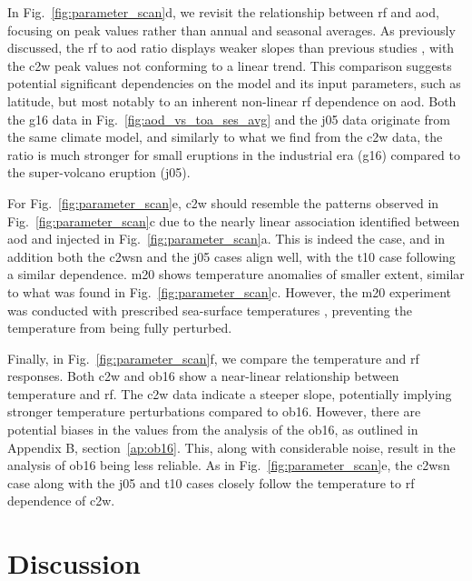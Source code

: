 \documentclass{ametsocV6.1}
\newcommand{\iso}[1][i]{{#1}njected \ce{SO2}}
\begin{document}
In Fig.~\ref{fig:parameter_scan}d, we revisit the relationship between \gls{rf} and
\gls{aod}, focusing on peak values rather than annual and seasonal averages. As
previously discussed, the \gls{rf} to \gls{aod} ratio displays weaker slopes than
previous studies \citep{jones2005, marshall2020, timmreck2010}, with the \gls{c2w} peak
values not conforming to a linear trend. This comparison suggests potential significant
dependencies on the model and its input parameters, such as latitude, but most notably
to an inherent non-linear \gls{rf} dependence on \gls{aod}. Both the \gls{g16} data in
Fig.~\ref{fig:aod_vs_toa_ses_avg} and the \gls{j05} data originate from the same climate
model, and similarly to what we find from the \gls{c2w} data, the ratio is much stronger
for small eruptions in the industrial era (\gls{g16}) compared to the super-volcano
eruption (\gls{j05}).

For Fig.~\ref{fig:parameter_scan}e, \gls{c2w} should resemble the patterns observed in
Fig.~\ref{fig:parameter_scan}c due to the nearly linear association identified between
\gls{aod} and \iso{} in Fig.~\ref{fig:parameter_scan}a. This is indeed the case, and in
addition both the \gls{c2wsn} and the \gls{j05} cases align well, with the \gls{t10}
case following a similar dependence. \gls{m20} shows temperature anomalies of smaller
extent, similar to what was found in Fig.~\ref{fig:parameter_scan}c. However, the
\gls{m20} experiment was conducted with prescribed sea-surface temperatures
\citep{marshall2020}, preventing the temperature from being fully perturbed.

Finally, in Fig.~\ref{fig:parameter_scan}f, we compare the temperature and \gls{rf}
responses. Both \gls{c2w} and \gls{ob16} show a near-linear relationship between
temperature and \gls{rf}. The \gls{c2w} data indicate a steeper slope, potentially
implying stronger temperature perturbations compared to \gls{ob16}. However, there are
potential biases in the values from the analysis of the \gls{ob16}, as outlined in
Appendix B, section~\ref{ap:ob16}. This, along with considerable noise, result in the
analysis of \gls{ob16} being less reliable. As in Fig.~\ref{fig:parameter_scan}e, the
\gls{c2wsn} case along with the \gls{j05} and \gls{t10} cases closely follow the
temperature to \gls{rf} dependence of \gls{c2w}.

\section{Discussion}\label{sec:discussion}
\end{document}
